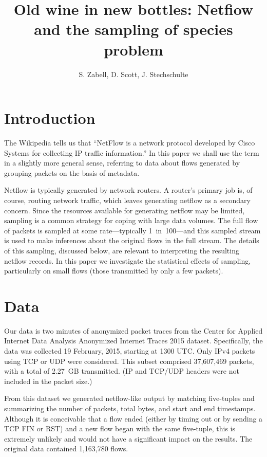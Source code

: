 \documentclass{paper}
\title{Old wine in new bottles: Netfiow and the sampling of species problem}
\author{S. Zabell, D. Scott, J. Stechschulte}
\begin{document}
\maketitle

\section{Introduction}
The Wikipedia tells us that ``NetFlow is a network protocol developed by Cisco
Systems for collecting IP traffic information.'' In this paper we shall use the
term in a slightly more general sense, referring to data about flows generated
by grouping packets on the basis of metadata.

Netflow is typically generated by network routers. A router's primary job is, of
course, routing network traffic, which leaves generating netflow as a secondary
concern. Since the resources available for generating netflow may be limited,
sampling is a common strategy for coping with large data volumes. The full flow
of packets is sampled at some rate---typically 1~in~100---and this sampled
stream is used to make inferences about the original flows in the full stream.
The details of this sampling, discussed below, are relevant to interpreting the
resulting netflow records. In this paper we investigate the statistical effects
of sampling, particularly on small flows (those transmitted by only a few
packets).

\section{Data}
Our data is two minutes of anonymized packet traces from the Center for Applied
Internet Data Analysis Anonymized Internet Traces 2015 dataset. Specifically,
the data was collected 19 February, 2015, starting at 1300 UTC\@. Only IPv4
packets using TCP or UDP were considered. This subset comprised 37,607,469
packets, with a total of 2.27~GB transmitted. (IP and TCP/UDP headers were not
included in the packet size.)

From this dataset we generated netflow-like output by matching five-tuples and
summarizing the number of packets, total bytes, and start and end timestamps.
Although it is conceivable that a flow ended (either by timing out or by sending
a TCP FIN or RST) and a new flow began with the same five-tuple, this is
extremely unlikely and would not have a significant impact on the results.  The
original data contained 1,163,780 flows.
\end{document}
